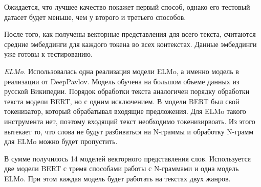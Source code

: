 \documentclass[a4paper,14pt]{article}
\begin{document}
Ожидается, что лучшее качество покажет первый способ, однако его тестовый датасет будет меньше, чем у второго и третьего способов. 

После того, как получены векторные представления для всего текста, считаются средние эмбеддинги для каждого токена во всех контекстах.
Данные эмбеддинги уже готовы к тестированию.

\textit{ELMo.} Использовалась одна реализация модели ELMo, а именно модель в реализации от DeepPavlov.
Модель обучена на большом объеме данных из русской Википедии.
Порядок обработки текста аналогичен порядку обработки текста модели BERT, но с одним исключением.
В модели BERT был свой токенизатор, который обрабатывал входящие предложения.
Для ELMo такого инструмента нет, поэтому входящий текст необходимо токенизирвоать.
Из этого вытекает то, что слова не будут разбиваться на N-граммы и обработку N-грамм для ELMo можно будет пропустить.

В сумме получилось 14 моделей векторного представления слов.
Используется две модели BERT с тремя способами работы с N-граммами и одна модель ELMo.
При этом каждая модель будет работать на текстах двух жанров.
\end{document}
